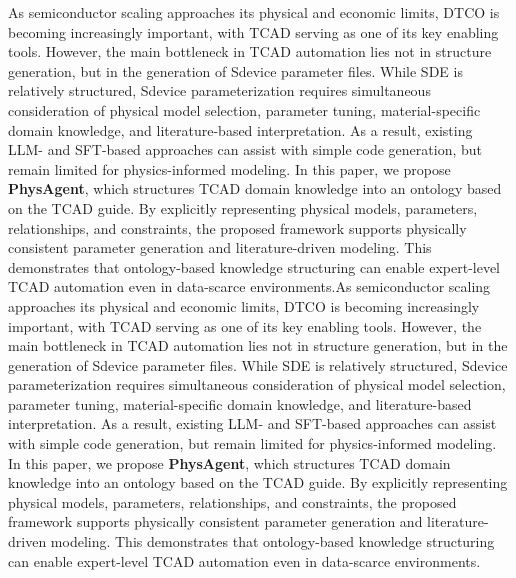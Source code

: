 As semiconductor scaling approaches its physical and economic limits, DTCO is becoming increasingly important, with TCAD serving as one of its key enabling tools. However, the main bottleneck in TCAD automation lies not in structure generation, but in the generation of Sdevice parameter files. While SDE is relatively structured, Sdevice parameterization requires simultaneous consideration of physical model selection, parameter tuning, material-specific domain knowledge, and literature-based interpretation. As a result, existing LLM- and SFT-based approaches can assist with simple code generation, but remain limited for physics-informed modeling. In this paper, we propose \textbf{PhysAgent}, which structures TCAD domain knowledge into an ontology based on the TCAD guide. By explicitly representing physical models, parameters, relationships, and constraints, the proposed framework supports physically consistent parameter generation and literature-driven modeling. This demonstrates that ontology-based knowledge structuring can enable expert-level TCAD automation even in data-scarce environments.As semiconductor scaling approaches its physical and economic limits, DTCO is becoming increasingly important, with TCAD serving as one of its key enabling tools. However, the main bottleneck in TCAD automation lies not in structure generation, but in the generation of Sdevice parameter files. While SDE is relatively structured, Sdevice parameterization requires simultaneous consideration of physical model selection, parameter tuning, material-specific domain knowledge, and literature-based interpretation. As a result, existing LLM- and SFT-based approaches can assist with simple code generation, but remain limited for physics-informed modeling. In this paper, we propose \textbf{PhysAgent}, which structures TCAD domain knowledge into an ontology based on the TCAD guide. By explicitly representing physical models, parameters, relationships, and constraints, the proposed framework supports physically consistent parameter generation and literature-driven modeling. This demonstrates that ontology-based knowledge structuring can enable expert-level TCAD automation even in data-scarce environments.